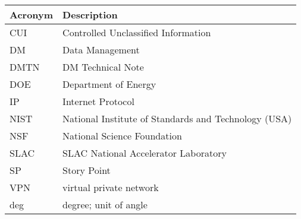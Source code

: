 \addtocounter{table}{-1}
\begin{longtable}{p{}p{}}\hline
\textbf{Acronym} & \textbf{Description}  \\\hline

CUI & Controlled Unclassified Information \\\hline
DM & Data Management \\\hline
DMTN & DM Technical Note \\\hline
DOE & Department of Energy \\\hline
IP & Internet Protocol \\\hline
NIST & National Institute of Standards and Technology (USA) \\\hline
NSF & National Science Foundation \\\hline
SLAC & SLAC National Accelerator Laboratory \\\hline
SP & Story Point \\\hline
VPN & virtual private network \\\hline
deg & degree; unit of angle \\\hline
\end{longtable}
